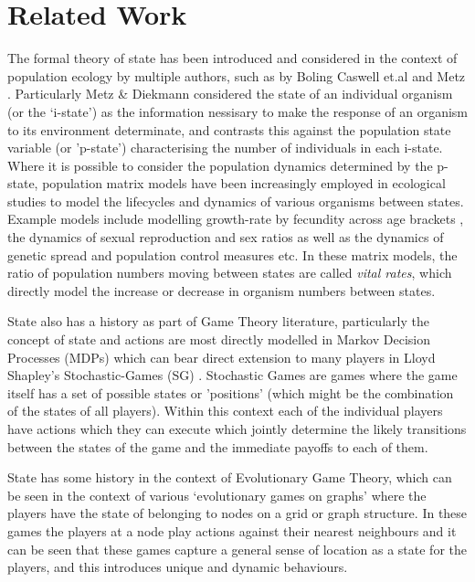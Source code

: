 \section{Related Work}\label{sec:-1}

The formal theory of state has been introduced and considered in the context of population ecology by multiple authors, 
such as by Boling \cite{BOLING1973485} Caswell et.al \cite{nla.cat-vn662318} and Metz \cite{Metz1977}. Particularly Metz \& Diekmann\cite{nla.cat-vn2330051} considered the state of an individual organism (or the `i-state') as the information nessisary to make the response of an organism to its environment determinate, and contrasts this against the population state variable (or 'p-state') characterising the number of individuals in each i-state. 
Where it is possible to consider the population dynamics determined by the p-state, population matrix models have been increasingly employed in ecological studies to model the lifecycles and dynamics of various organisms between states.\cite{doi:10.1111/j.1461-0248.2010.01540.x}
Example models include modelling growth-rate by fecundity across age brackets \cite{leslie}, the dynamics of sexual reproduction and sex ratios \cite{Shyu2018,doi:10.1111/1365-2664.12177} as well as the dynamics of genetic spread and population control measures \cite{DEVRIES2020108875} etc.
In these matrix models, the ratio of population numbers moving between states are called \textit{vital rates}, which directly model the increase or decrease in organism numbers between states.\cite{population1}

State also has a history as part of Game Theory literature, particularly the concept of state and actions are most directly modelled in Markov Decision Processes (MDPs) which can bear direct extension to many players in Lloyd Shapley's Stochastic-Games (SG) \cite{shapley53,Solan2015}. Stochastic Games are games where the game itself has a set of possible states or 'positions' (which might be the combination of the states of all players). Within this context each of the individual players have actions which they can execute which jointly determine the likely transitions between the states of the game and the immediate payoffs to each of them.

State has some history in the context of Evolutionary Game Theory, which can be seen in the context of various `evolutionary games on graphs' where the players have the state of belonging to nodes on a grid or graph structure. In these games the players at a node play actions against their nearest neighbours and it can be seen that these games capture a general sense of location as a state for the players, and this introduces unique and dynamic behaviours.\cite{nowak,spacial2,spacial4}

